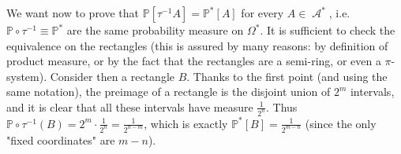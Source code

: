 \documentclass[12pt,a4paper]{report}
\theoremstyle{definition}
\theoremstyle{num.custom-title}
\DeclareMathOperator{\A}{\mathcal{A}}
\DeclareMathOperator{\B}{\mathcal{B}}
\renewcommand{\P}{\mathbb{P}}
\renewcommand{\1}{\mathbbm{1}}
\begin{document}
We want now to prove that $\P[\tau^{-1}A]=\P^*[A]$ for every $A \in \A^*$, i.e. $\P \circ \tau^{-1} \equiv \P^{*}$ are the same probability measure on $\Omega^*$. It is sufficient to check the equivalence on the rectangles (this is assured by many reasons: by definition of product measure, or by the fact that the rectangles are a semi-ring, or even a $\pi$-system). Consider then a rectangle $B$. Thanks to the first point (and using the same notation), the preimage of a rectangle is the disjoint union of $2^m$ intervals, and it is clear that all these intervals have measure $\frac{1}{2^n}$. Thus $\P \circ \tau^{-1} (B) = 2^m \cdot \frac{1}{2^n}=\frac{1}{2^{n-m}}$, which is exactly $\P^*[B]=\frac{1}{2^{m-n}}$ (since the only "fixed coordinates" are $m-n$).
%
\end{document}
